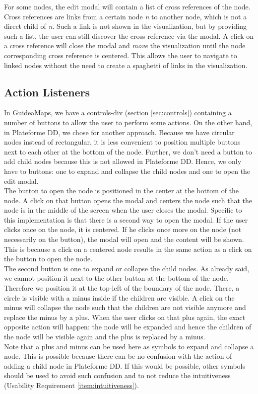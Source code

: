 For some nodes, the edit modal will contain a list of cross references of the node. Cross references are links from a certain node \textit{n} to another node, which is not a direct child of \textit{n}. Such a link is not shown in the visualization, but by providing such a list, the user can still discover the cross reference via the modal. A click on a cross reference will close the modal and \textit{move} the visualization until the node corresponding cross reference is centered. This allows the user to navigate to linked nodes without the need to create a spaghetti of links in the visualization.



\subsection{Action Listeners}\label{sec:usecase-actionlisteners}
In GuideaMaps, we have a controls-div (section \ref{sec:controls}) containing a number of buttons to allow the user to perform some actions. On the other hand, in Plateforme DD, we chose for another approach. Because we have circular nodes instead of rectangular, it is less convenient to position multiple buttons next to each other at the bottom of the node. Further, we don't need a button to add child nodes because this is not allowed in Plateforme DD. Hence, we only have to buttons: one to expand and collapse the child nodes and one to open the edit modal.\\

The button to open the node is positioned in the center at the bottom of the node. A click on that button opens the modal and centers the node such that the node is in the middle of the screen when the user closes the modal. Specific to this implementation is that there is a second way to open the modal. If the user clicks once on the node, it is centered. If he clicks once more on the node (not necessarily on the button), the modal will open and the content will be shown. This is because a click on a centered node results in the same action as a click on the button to open the node.\\

The second button is one to expand or collapse the child nodes. As already said, we cannot position it next to the other button at the bottom of the node. Therefore we position it at the top-left of the boundary of the node. There, a circle is visible with a minus inside if the children are visible. A click on the minus will collapse the node such that the children are not visible anymore and replace the minus by a plus. When the user clicks on that plus again, the exact opposite action will happen: the node will be expanded and hence the children of the node will be visible again and the plus is replaced by a minus.\\

Note that a plus and minus can be used here as symbols to expand and collapse a node. This is possible because there can be no confusion with the action of adding a child node in Plateforme DD. If this would be possible, other symbols should be used to avoid such confusion and to not reduce the intuitiveness (Usability Requirement \ref{item:intuitiveness}).


